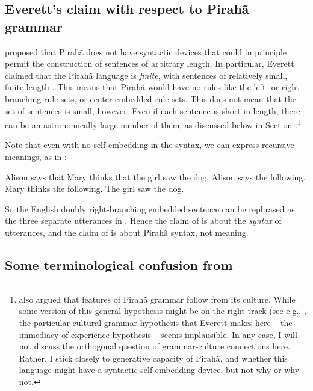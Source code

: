 \documentclass{article}
\begin{document}
\subsection{Everett's claim with respect to Pirahã grammar}

\citet{everett2005cultural} proposed that Pirahã does not have syntactic devices that could in principle permit the construction of sentences of arbitrary length. In particular, Everett claimed that the Pirahã language is \textit{finite}, with sentences of relatively small, finite length \citep{everett2012does}. This means that Pirahã would have no rules like the left- or right-branching rule sets, or center-embedded rule sets.  This does not mean that the set of sentences is small, however.  Even if each sentence is short in length, there can be an astronomically large number of them, as discussed below in Section .\footnote{\citet{everett2005cultural} also argued that features of Pirahã grammar follow from its culture.  While some version of this general hypothesis might be on the right track (see e.g., \citet{gil2021tense}, the particular cultural-grammar hypothesis that Everett makes here -- the immediacy of experience hypothesis -- seems implausible.  In any case, I will not discuss the orthogonal question of grammar-culture connections here.  Rather, I stick closely to generative capacity of Pirahã, and whether this language might have a syntactic  self-embedding device, but not why or why not.}

Note that even with no self-embedding in the syntax, we can express recursive meanings, as in :

\eal
\label{rec_meaning}
\ex \label{rec_meaning1} Alison says that Mary thinks that the girl saw the dog.
\ex \label{rec_meaning2} Alison says the following. Mary thinks the following. The girl saw the dog.
\zl

\noindent
So the English doubly right-branching embedded sentence  can be rephrased as the three separate utterances in . 
 Hence the claim of \citet{hauser2002faculty} is about the \textit{syntax} of utterances, and the claim of \citet{everett2005cultural} is about Pirahã syntax, not meaning.

\subsection{Some terminological confusion from \citet{nevins2009evidence}}
\end{document}
